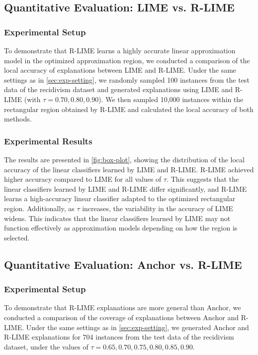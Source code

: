 \documentclass[runningheads]{llncs}
\begin{document}
\vspace{-1pt}
\subsection{Quantitative Evaluation: LIME vs. R-LIME}

\subsubsection{Experimental Setup}
To demonstrate that R-LIME learns a highly accurate linear approximation model
in the optimized approximation region,
we conducted a comparison of the local accuracy of explanations
between LIME and R-LIME\@.
Under the same settings as in \cref{sec:exp-setting},
we randomly sampled 100 instances from the test data of the recidivism dataset
and generated explanations using LIME and R-LIME (with $\tau=0.70,0.80,0.90$).
We then sampled 10,000 instances within the rectangular region
obtained by R-LIME and calculated the local accuracy of both methods.

\subsubsection{Experimental Results}
The results are presented in \cref{fig:box-plot},
showing the distribution of the local accuracy of the linear classifiers
learned by LIME and R-LIME\@.
R-LIME achieved higher accuracy compared to LIME for all values of $\tau$.
This suggests that the linear classifiers learned by LIME and R-LIME
differ significantly,
and R-LIME learns a high-accuracy linear classifier
adapted to the optimized rectangular region.
Additionally, as $\tau$ increases,
the variability in the accuracy of LIME widens.
This indicates that the linear classifiers learned by LIME may not function
effectively as approximation models depending on how the region is selected.

\subsection{Quantitative Evaluation: Anchor vs. R-LIME}
\subsubsection{Experimental Setup}
To demonstrate that R-LIME explanations are more general than Anchor,
we conducted a comparison of the coverage of explanations
between Anchor and R-LIME\@.
Under the same settings as in
\cref{sec:exp-setting},
we generated Anchor and R-LIME explanations
for 704 instances from the test data of the recidivism dataset,
under the values of $\tau=0.65,0.70,0.75,0.80,0.85,0.90$.
\end{document}
